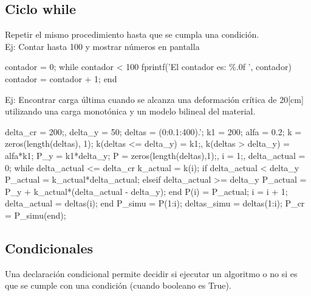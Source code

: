 \subsection{Ciclo while}
Repetir el mismo procedimiento hasta que se cumpla una condición. \\

Ej: Contar hasta 100 y mostrar números en pantalla
\begin{verbatimg}
    contador = 0;
    while contador < 100
        fprintf('El contador es: \%.0f \n', contador) 
        contador = contador + 1; %
    end
\end{verbatimg}

\newpage
Ej: Encontrar carga última cuando se alcanza una deformación crítica  de 20[cm] utilizando una carga monotónica y un modelo bilineal del material.

\begin{verbatimg}
    delta_cr = 200;, delta_y = 50; %
    deltas = (0:0.1:400).'; %
    k1 = 200; %
    alfa = 0.2; %
    k = zeros(length(deltas), 1);
    k(deltas <= delta_y) = k1;, %
    k(deltas > delta_y) = alfa*k1; %
    P_y = k1*delta_y; %
    P = zeros(length(deltas),1);, i = 1;, delta_actual = 0;
    while delta_actual <= delta_cr %
        k_actual = k(i);
        if delta_actual < delta_y %
            P_actual = k_actual*delta_actual;
        elseif delta_actual >= delta_y %
            P_actual = P_y + k_actual*(delta_actual - delta_y);
        end
        P(i) = P_actual;            %
        i = i + 1;                  %
        delta_actual = deltas(i);   %
    end
    P_simu = P(1:i);                %
    deltas_simu = deltas(1:i);      %
    P_cr = P_simu(end);             %
\end{verbatimg}

\subsection{Condicionales}
Una declaración condicional permite decidir si ejecutar un algoritmo o no si es que se cumple con una condición (cuando booleano es True). \\

